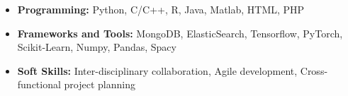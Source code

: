 
\begin{itemize}[nosep]
\vspace{.5em}
    \item \textbf{Programming:} Python, C/C++, R, Java, Matlab,
  HTML, PHP

  \item \textbf{Frameworks and Tools:} MongoDB, ElasticSearch, Tensorflow, PyTorch, Scikit-Learn, Numpy, Pandas, Spacy
  \item \textbf{Soft Skills: } Inter-disciplinary collaboration, Agile development, Cross-functional project planning
\end{itemize}


